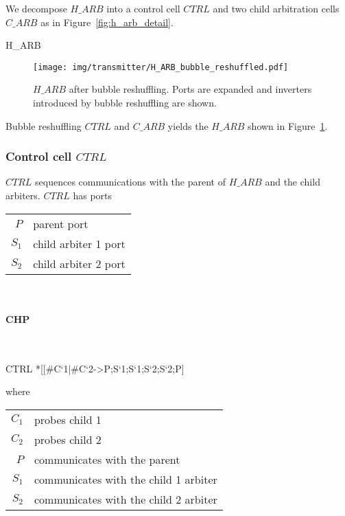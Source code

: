 \documentclass[aer.tex]{subfiles}
\begin{document}
We decompose $H\!\_ARB$ into a control cell $CTRL$ and two child arbitration cells $C\_ARB$ as in Figure~\ref{fig:h_arb_detail}.

\begin{csp}
H\_ARB
\end{csp}

\begin{figure}
  \centering
  \texttt{[image: img/transmitter/H\_ARB\_bubble\_reshuffled.pdf]}
  \caption{$H\!\_ARB$ after bubble reshuffling. Ports are expanded and inverters introduced by bubble reshuffling are shown.}
  \label{fig:h_arb_bubbled}
\end{figure}

\noindent Bubble reshuffling $CTRL$ and $C\_ARB$ yields the $H\!\_ARB$ shown in Figure~\ref{fig:h_arb_bubbled}.

\subsubsection{Control cell $CTRL$}
$CTRL$ sequences communications with the parent of $H\!\_ARB$ and the child arbiters.
$CTRL$ has ports

\begin{tabular}[]{rl}
$P$ & parent port \\
$S_1$ & child arbiter 1 port \\
$S_2$ & child arbiter 2 port \\
\end{tabular} \\

\paragraph{CHP}\mbox{}\\

\begin{csp}
CTRL\equiv
  *[[#{C`1}|#{C`2}->P;S`1;S`1;S`2;S`2;P]
\end{csp}

\noindent where 

\begin{tabular}[]{rl}
  $C_1$ & probes child 1 \\
  $C_2$ & probes child 2 \\
  $P$ & communicates with the parent \\
  $S_1$ & communicates with the child 1 arbiter \\
  $S_2$ & communicates with the child 2 arbiter \\
\end{tabular} \\ \\
\end{document}
